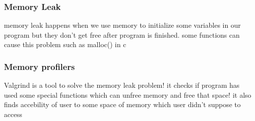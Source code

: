 \documentclass[titlepage]{article}
\begin{document}
\subsubsection{Memory Leak}
memory leak happens when we use memory to initialize some variables in our program but they don't get free after program is finished. some functions can cause this problem such as malloc() in c
\subsubsection{Memory profilers}
Valgrind is a tool to solve the memory leak problem! it checks if program has used some special functions which can unfree memory and free that space! it also finds accebility of user to some space of memory which user didn't suppose to access
\end{document}
